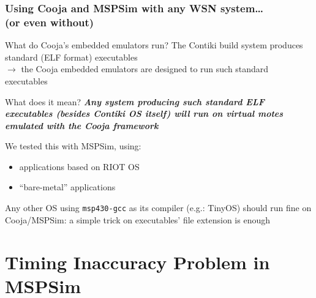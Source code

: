 \documentclass[10pt,c]{beamer}
\renewcommand{\emph}[1]{\textbf{\textit{#1}}}
\begin{document}
\begin{frame}
\frametitle{Using Cooja and MSPSim with any WSN system\ldots \\
            (or even without)}
\begin{block}{What do Cooja's embedded emulators run?}
\small
The Contiki build system produces standard (ELF format) executables \\
$\rightarrow$ the Cooja embedded emulators are designed to run such
standard executables
\end{block}
\begin{exampleblock}{What does it mean?}
\small
\emph{Any system producing such standard ELF executables (besides Contiki
OS itself) will run on virtual motes emulated with the Cooja framework}

We tested this with MSPSim, using:
\begin{itemize}
\item applications based on RIOT OS
\item ``bare-metal'' applications
\end{itemize}

Any other OS using \texttt{msp430-gcc} as its compiler (e.g.: TinyOS)
should run fine on Cooja/MSPSim: a simple trick on executables' file
extension is enough
\end{exampleblock}
\end{frame}


\section{Timing Inaccuracy Problem in MSPSim}
\end{document}
